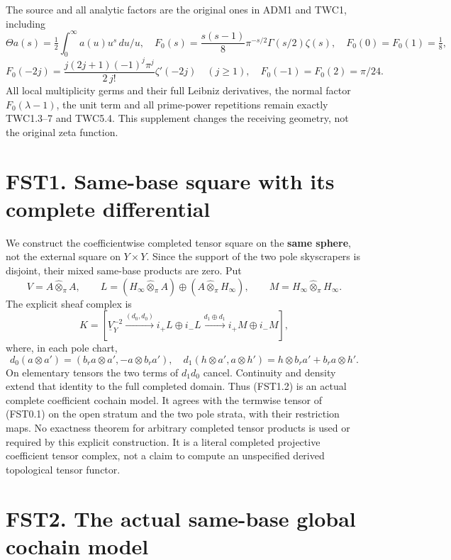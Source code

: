 The source and all analytic factors are the original ones in ADM1 and
TWC1, including \[
\Theta a(s)=\tfrac12\int_0^\infty a(u)u^s\,du/u,
\quad F_0(s)=\frac{s(s-1)}8\pi^{-s/2}\Gamma(s/2)\zeta(s),
\quad F_0(0)=F_0(1)=\tfrac18,
\] \[
F_0(-2j)=\frac{j(2j+1)(-1)^j\pi^j}{2\,j!}\zeta'(-2j)\quad(j\ge1),
\quad F_0(-1)=F_0(2)=\pi/24.
\tag{FST0.2}
\] All local multiplicity germs and their full Leibniz derivatives, the
normal factor \(F_0(\lambda-1)\), the unit term and all prime-power
repetitions remain exactly TWC1.3--7 and TWC5.4. This supplement changes
the receiving geometry, not the original zeta function.

\section{FST1. Same-base square with its complete
differential}\label{fst1.-same-base-square-with-its-complete-differential}

We construct the coefficientwise completed tensor square on the
\textbf{same sphere}, not the external square on \(Y\times Y\). Since
the support of the two pole skyscrapers is disjoint, their mixed
same-base products are zero. Put \[
V=A\widehat\otimes_\pi A,\qquad
L=(H_\infty\widehat\otimes_\pi A)\oplus(A\widehat\otimes_\pi H_\infty),
\qquad M=H_\infty\widehat\otimes_\pi H_\infty.
\tag{FST1.1}
\] The explicit sheaf complex is \[
K=[\underline V_Y^{-2}\xrightarrow{(d_0,d_0)}i_+L\oplus i_-L
\xrightarrow{d_1\oplus d_1}i_+M\oplus i_-M],
\tag{FST1.2}
\] where, in each pole chart, \[
d_0(a\otimes a')=(b_ra\otimes a',-a\otimes b_ra'),
\quad d_1(h\otimes a',a\otimes h')=h\otimes b_ra'+b_ra\otimes h'.
\tag{FST1.3}
\] On elementary tensors the two terms of \(d_1d_0\) cancel. Continuity
and density extend that identity to the full completed domain. Thus
(FST1.2) is an actual complete coefficient cochain model. It agrees with
the termwise tensor of (FST0.1) on the open stratum and the two pole
strata, with their restriction maps. No exactness theorem for arbitrary
completed tensor products is used or required by this explicit
construction. It is a literal completed projective coefficient tensor
complex, not a claim to compute an unspecified derived topological
tensor functor.

\section{FST2. The actual same-base global cochain
model}\label{fst2.-the-actual-same-base-global-cochain-model}

